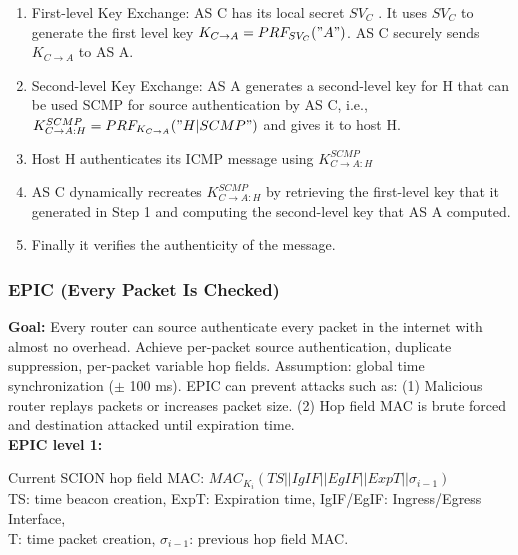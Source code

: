 \documentclass[11pt,oneside,a4paper]{article}
\begin{document}
\vspace{-\topsep}
\begin{enumerate}
	\setlength{\itemsep}{0pt}
	\setlength{\parskip}{0pt}
	\item First-level Key Exchange: AS C has its local secret $SV_C$ . It uses $SV_C$ to generate the first
	level key $K_{C\rightarrow A} = PRF_{SV_C}("A")$. AS C securely sends $K_{C\rightarrow A}$ to AS A.
	
	\item Second-level Key Exchange: AS A generates a second-level key for H that can be used SCMP for source authentication by AS C, i.e., $K_{C\rightarrow A:H}^{SCMP} = PRF_{K_{C\rightarrow A}}("H|SCMP")$ and gives it to host H.
	
	\item Host H authenticates its ICMP message using $K_{C\rightarrow A:H}^{SCMP}$
	
	\item AS C dynamically recreates $K_{C\rightarrow A:H}^{SCMP}$ by retrieving the first-level key that it generated in Step 1 and computing the second-level key that AS A computed.
	
	\item Finally it verifies the authenticity of the message.
\end{enumerate}
\vspace{-\topsep}

\newpage

\subsubsection{EPIC (Every Packet Is Checked)}

\noindent \textbf{Goal:} Every router can source authenticate every packet in the internet with almost no overhead. Achieve per-packet source authentication, duplicate suppression, per-packet variable hop fields. Assumption: global time synchronization ($\pm$ 100 ms). EPIC can prevent attacks such as: (1) Malicious router replays packets or increases packet size. (2) Hop field MAC is brute forced and destination attacked until expiration time.\\

\noindent \textbf{EPIC level 1:} 

Current SCION hop field MAC: $MAC_{K_i}(TS||IgIF||EgIF||ExpT||\sigma_{i-1})$\\

\noindent TS: time beacon creation, ExpT: Expiration time, IgIF/EgIF: Ingress/Egress Interface,\\
T: time packet creation, $\sigma_{i-1}$: previous hop field MAC.\\
\end{document}
